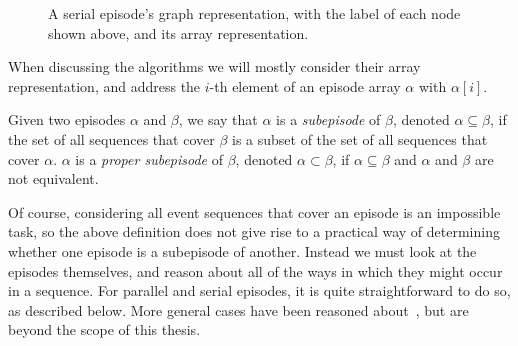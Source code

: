\begin{figure}[h]
\centering


\caption{A serial episode's graph representation, with the label of each node shown above, and its array representation.}
\label{fig:serial-representation}
\end{figure}

When discussing the algorithms we will mostly consider their array representation, and address the $ i $-th element of an episode array $ \alpha $ with $ \alpha [i] $.

\begin{definition}
Given two episodes $ \alpha $ and $ \beta $, we say that $ \alpha $ is a \emph{subepisode} of $ \beta $, denoted $ \alpha \subseteq \beta $, if the set of all sequences that cover $ \beta $ is a subset of the set of all sequences that cover $ \alpha $. $ \alpha $ is a \emph{proper subepisode} of $ \beta $, denoted $ \alpha \subset \beta $, if $ \alpha \subseteq \beta $ and $ \alpha $ and $ \beta $ are not equivalent.
\end{definition}

Of course, considering all event sequences that cover an episode is an impossible task, so the above definition does not give rise to a practical way of determining whether one episode is a subepisode of another. Instead we must look at the episodes themselves, and reason about all of the ways in which they might occur in a sequence. For parallel and serial episodes, it is quite straightforward to do so, as described below. More general cases have been reasoned about~\cite{tatti2012mining}, but are beyond the scope of this thesis.


